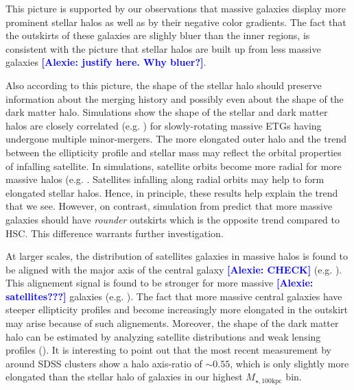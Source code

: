 \documentclass[a4paper,fleqn,usenatbib]{mnras}
\def\mtot{{$M_{\star,100\mathrm{kpc}}$}}
\newcommand{\alexie}[1]{\textcolor{blue}{\textbf{[Alexie: #1]}}}
\begin{document}
    This picture is supported by our observations that massive galaxies display more prominent stellar halos as well as by their  negative color gradients. The fact that the outskirts of these galaxies are slighly bluer than  the inner regions, is  consistent with the picture that  stellar halos are built up from  less massive galaxies \alexie{justify here. Why bluer?}.
      
    Also according to this picture, the shape of the stellar halo should preserve information
    about the merging history and possibly even about the shape of the dark matter halo. 
    Simulations show the shape of the stellar and dark matter halos are closely correlated (e.g. \citealt{Wu2014}) for slowly-rotating massive ETGs having undergone multiple 
    minor-mergers. The more elongated outer halo and the trend between the ellipticity profile and 
    stellar mass may reflect the orbital properties of infalling satellite. 
    In simulations, satellite orbits become more radial for more massive halos (e.g. \citealt{Murante2007, Wetzel2011, Jiang2015}. Satellites infalling along radial orbits may  help to form elongated  stellar halos. Hence, in principle, these results help explain the trend that we see. However, on contrast, simulation from \citet{Wu2014} predict that more massive 
    galaxies should have \emph{rounder} outskirts which is the opposite trend compared to HSC. This difference warrants further investigation.
    
    At larger scales, the distribution of satellites galaxies in massive halos is found to  be aligned with the major axis of the central galaxy \alexie{CHECK} (e.g. \citealt{Brainerd2005, 
    Yang2006b, NiedersteOstholt2010, HuangMandelbaum2016}). This alignement signal is found to be stronger for more massive \alexie{satellites???} galaxies (e.g. \citealt{Hirata2007}).
    The fact that more massive central galaxies have steeper ellipticity profiles 
    and become increasingly more elongated in the outskirt may arise because of such alignements. Moreover, the shape of the dark matter halo can be estimated by analyzing satellite distributions and weak lensing profiles (\citealt{ClampittJain2016}). 
    It is interesting to point out that the most recent measurement by 
    \citet{Shin2017} around SDSS clusters show a halo axis-ratio of ${\sim}0.55$, 
    which is only slightly more elongated than the stellar halo of galaxies in our 
    highest \mtot{} bin.
    
    
\end{document}
